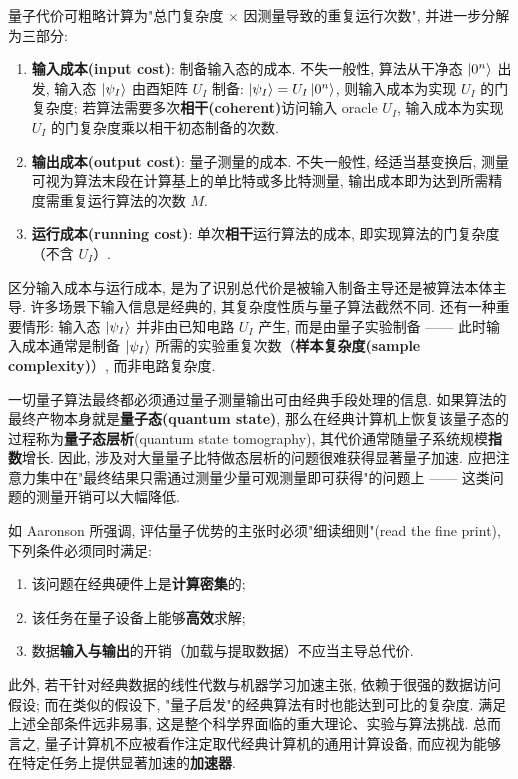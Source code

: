 \documentclass[utf8]{article} %
\numberwithin{equation}{section}   %
\newtheorem{Def}{\hskip 2em {\color{green} 定义}}[subsection]
\newtheorem{Note}{\hskip 2em {\color{red} 注}}[subsection]
\begin{document}
\begin{Def}
    量子代价可粗略计算为"总门复杂度 $\times$ 因测量导致的重复运行次数", 并进一步分解为三部分:
    \begin{enumerate}
        \item \textbf{输入成本(input cost)}: 制备输入态的成本. 不失一般性, 算法从干净态 $\ket{0^n}$ 出发, 输入态 $\ket{\psi_I}$ 由酉矩阵 $U_I$ 制备: $\ket{\psi_I} = U_I \ket{0^n}$, 则输入成本为实现 $U_I$ 的门复杂度; 若算法需要多次\textbf{相干(coherent)}访问输入 oracle $U_I$, 输入成本为实现 $U_I$ 的门复杂度乘以相干初态制备的次数.
        \item \textbf{输出成本(output cost)}: 量子测量的成本. 不失一般性, 经适当基变换后, 测量可视为算法末段在计算基上的单比特或多比特测量, 输出成本即为达到所需精度需重复运行算法的次数 $M$.
        \item \textbf{运行成本(running cost)}: 单次\textbf{相干}运行算法的成本, 即实现算法的门复杂度（不含 $U_I$）.
    \end{enumerate}
    区分输入成本与运行成本, 是为了识别总代价是被输入制备主导还是被算法本体主导. 许多场景下输入信息是经典的, 其复杂度性质与量子算法截然不同. 还有一种重要情形: 输入态 $\ket{\psi_I}$ 并非由已知电路 $U_I$ 产生, 而是由量子实验制备 —— 此时输入成本通常是制备 $\ket{\psi_I}$ 所需的实验重复次数（\textbf{样本复杂度(sample complexity)}）, 而非电路复杂度.
\end{Def}

\begin{Note}
    一切量子算法最终都必须通过量子测量输出可由经典手段处理的信息. 如果算法的最终产物本身就是\textbf{量子态(quantum state)}, 那么在经典计算机上恢复该量子态的过程称为\textbf{量子态层析}(quantum state tomography), 其代价通常随量子系统规模\textbf{指数}增长. 因此, 涉及对大量量子比特做态层析的问题很难获得显著量子加速. 应把注意力集中在"最终结果只需通过测量少量可观测量即可获得"的问题上 —— 这类问题的测量开销可以大幅降低.
\end{Note}

\begin{Note}
    如 Aaronson 所强调, 评估量子优势的主张时必须"细读细则"(read the fine print), 下列条件必须同时满足:
    \begin{enumerate}
        \item 该问题在经典硬件上是\textbf{计算密集}的;
        \item 该任务在量子设备上能够\textbf{高效}求解;
        \item 数据\textbf{输入与输出}的开销（加载与提取数据）不应当主导总代价.
    \end{enumerate}
    此外, 若干针对经典数据的线性代数与机器学习加速主张, 依赖于很强的数据访问假设; 而在类似的假设下, "量子启发"的经典算法有时也能达到可比的复杂度. 满足上述全部条件远非易事, 这是整个科学界面临的重大理论、实验与算法挑战. 总而言之, 量子计算机不应被看作注定取代经典计算机的通用计算设备, 而应视为能够在特定任务上提供显著加速的\textbf{加速器}.
\end{Note}
\end{document}
